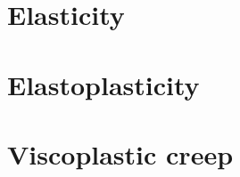 

\section{Elasticity}
\label{sec:M_elasticity}











\section{Elastoplasticity}
\label{sec:M_elastoplasticity}







\section{Viscoplastic creep}
\label{sec:M_creep}







